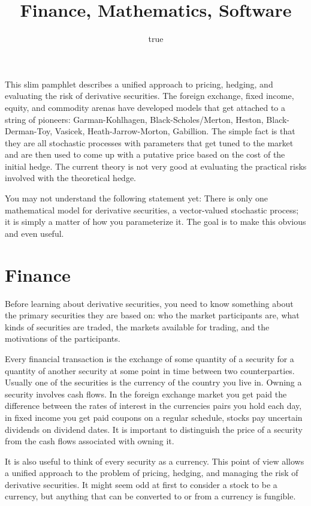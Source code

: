 \documentclass[]{article}
\title{Finance, Mathematics, Software}
\author{true}
\begin{document}
\maketitle

This slim pamphlet describes a unified approach to pricing, hedging, and
evaluating the risk of derivative securities. The foreign exchange,
fixed income, equity, and commodity arenas have developed models that
get attached to a string of pioneers: Garman-Kohlhagen,
Black-Scholes/Merton, Heston, Black-Derman-Toy, Vasicek,
Heath-Jarrow-Morton, Gabillion. The simple fact is that they are all
stochastic processes with parameters that get tuned to the market and
are then used to come up with a putative price based on the cost of the
initial hedge. The current theory is not very good at evaluating the
practical risks involved with the theoretical hedge.

You may not understand the following statement yet: There is only one
mathematical model for derivative securities, a vector-valued stochastic
process; it is simply a matter of how you parameterize it. The goal is
to make this obvious and even useful.

\section{Finance}\label{finance}

Before learning about derivative securities, you need to know something
about the primary securities they are based on: who the market
participants are, what kinds of securities are traded, the markets
available for trading, and the motivations of the participants.

Every financial transaction is the exchange of some quantity of a
security for a quantity of another security at some point in time
between two counterparties. Usually one of the securities is the
currency of the country you live in. Owning a security involves cash
flows. In the foreign exchange market you get paid the difference
between the rates of interest in the currencies pairs you hold each day,
in fixed income you get paid coupons on a regular schedule, stocks pay
uncertain dividends on dividend dates. It is important to distinguish
the price of a security from the cash flows associated with owning it.

It is also useful to think of every security as a currency. This point
of view allows a unified approach to the problem of pricing, hedging,
and managing the risk of derivative securities. It might seem odd at
first to consider a stock to be a currency, but anything that can be
converted to or from a currency is fungible.
\end{document}
